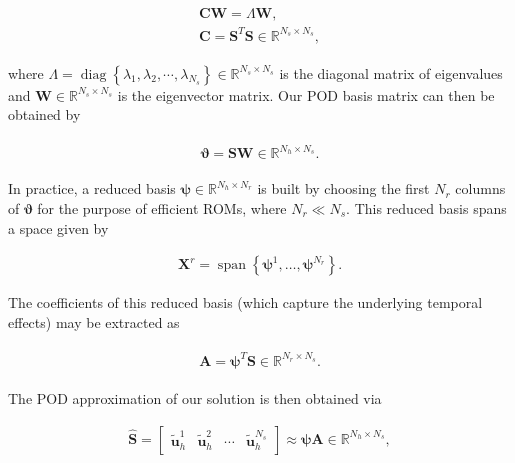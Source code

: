 \documentclass[preprint,12pt]{elsarticle}
\begin{document}
\begin{linenomath*}
\begin{align}
\begin{gathered}
\mathbf{C} \mathbf{W} = \Lambda \mathbf{W}, \\
\mathbf{C} = \mathbf{S}^T \mathbf{S} \in \mathbb{R}^{N_s \times N_s},
\end{gathered}
\end{align}
\end{linenomath*}
where $\Lambda = \operatorname{diag}\left\{\lambda_{1}, \lambda_{2}, \cdots, \lambda_{N_{s}}\right\} \in \mathbb{R}^{N_{s} \times N_{s}}$ is the diagonal matrix of eigenvalues and $\mathbf{W} \in \mathbb{R}^{N_{s} \times N_{s}}$ is the eigenvector matrix. Our POD basis matrix can then be obtained by
\begin{linenomath*}
\begin{align}
\begin{gathered}
\boldsymbol{\vartheta} = \mathbf{S} \mathbf{W} \in \mathbb{R}^{N_h \times N_s}.
\end{gathered}
\end{align}
\end{linenomath*}
In practice, a reduced basis $\boldsymbol{\psi} \in \mathbb{R}^{N_h \times N_r}$ is built by choosing the first $N_r$ columns of $\boldsymbol{\vartheta}$ for the purpose of efficient ROMs, where $N_r \ll N_s$. This reduced basis spans a space given by
\begin{linenomath*}
\begin{align}
\mathbf{X}^{r}=\operatorname{span}\left\{\boldsymbol{\psi}^{1}, \dots, \boldsymbol{\psi}^{N_r}\right\}.
\end{align}
\end{linenomath*}
The coefficients of this reduced basis (which capture the underlying temporal effects) may be extracted as
\begin{linenomath*}
\begin{align}
\begin{gathered}
\mathbf{A} = \boldsymbol{\psi}^{T} \mathbf{S} \in \mathbb{R}^{N_r \times N_s}.
\end{gathered}
\end{align}
\end{linenomath*}
The POD approximation of our solution is then obtained via
\begin{linenomath*}
\begin{align}
\hat{\mathbf{S}} =  [\begin{array}{c|c|c|c}{\tilde{\mathbf{u}}^{1}_h} & {\tilde{\mathbf{u}}^{2}_h} & {\cdots} & {\tilde{\mathbf{u}}^{N_{s}}_h}\end{array}] \approx \boldsymbol{\psi} \mathbf{A} \in \mathbb{R}^{N_h \times N_s},
\end{align}
\end{linenomath*}
\end{document}

